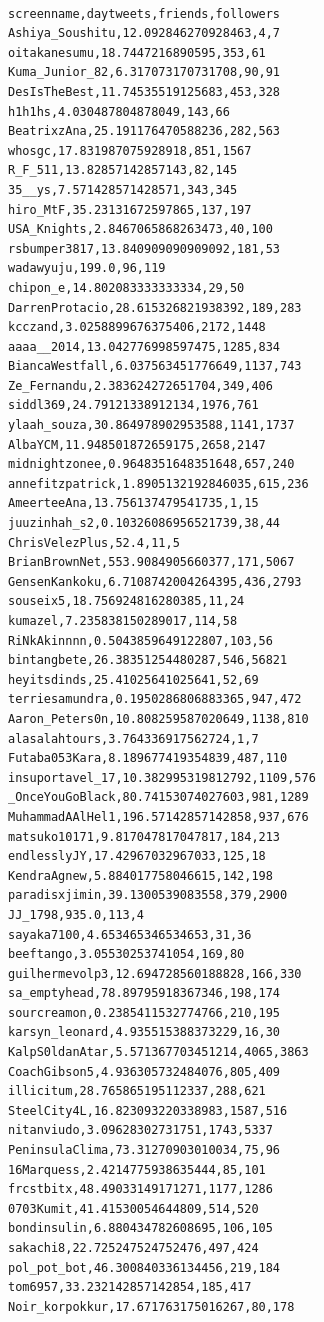 \begin{verbatim}

screenname,daytweets,friends,followers
Ashiya_Soushitu,12.092846270928463,4,7
oitakanesumu,18.7447216890595,353,61
Kuma_Junior_82,6.317073170731708,90,91
DesIsTheBest,11.74535519125683,453,328
h1h1hs,4.030487804878049,143,66
BeatrixzAna,25.191176470588236,282,563
whosgc,17.831987075928918,851,1567
R_F_511,13.82857142857143,82,145
35__ys,7.571428571428571,343,345
hiro_MtF,35.23131672597865,137,197
USA_Knights,2.8467065868263473,40,100
rsbumper3817,13.840909090909092,181,53
wadawyuju,199.0,96,119
chipon_e,14.802083333333334,29,50
DarrenProtacio,28.615326821938392,189,283
kcczand,3.0258899676375406,2172,1448
aaaa__2014,13.042776998597475,1285,834
BiancaWestfall,6.037563451776649,1137,743
Ze_Fernandu,2.383624272651704,349,406
siddl369,24.79121338912134,1976,761
ylaah_souza,30.864978902953588,1141,1737
AlbaYCM,11.948501872659175,2658,2147
midnightzonee,0.9648351648351648,657,240
annefitzpatrick,1.8905132192846035,615,236
AmeerteeAna,13.756137479541735,1,15
juuzinhah_s2,0.10326086956521739,38,44
ChrisVelezPlus,52.4,11,5
BrianBrownNet,553.9084905660377,171,5067
GensenKankoku,6.7108742004264395,436,2793
souseix5,18.756924816280385,11,24
kumazel,7.235838150289017,114,58
RiNkAkinnnn,0.5043859649122807,103,56
bintangbete,26.38351254480287,546,56821
heyitsdinds,25.41025641025641,52,69
terriesamundra,0.1950286806883365,947,472
Aaron_Peters0n,10.808259587020649,1138,810
alasalahtours,3.764336917562724,1,7
Futaba053Kara,8.189677419354839,487,110
insuportavel_17,10.382995319812792,1109,576
_OnceYouGoBlack,80.74153074027603,981,1289
MuhammadAAlHel1,196.57142857142858,937,676
matsuko10171,9.817047817047817,184,213
endlesslyJY,17.42967032967033,125,18
KendraAgnew,5.884017758046615,142,198
paradisxjimin,39.1300539083558,379,2900
JJ_1798,935.0,113,4
sayaka7100,4.653465346534653,31,36
beeftango,3.05530253741054,169,80
guilhermevolp3,12.694728560188828,166,330
sa_emptyhead,78.89795918367346,198,174
sourcreamon,0.2385411532774766,210,195
karsyn_leonard,4.935515388373229,16,30
KalpS0ldanAtar,5.571367703451214,4065,3863
CoachGibson5,4.936305732484076,805,409
illicitum,28.765865195112337,288,621
SteelCity4L,16.823093220338983,1587,516
nitanviudo,3.09628302731751,1743,5337
PeninsulaClima,73.31270903010034,75,96
16Marquess,2.4214775938635444,85,101
frcstbitx,48.49033149171271,1177,1286
0703Kumit,41.41530054644809,514,520
bondinsulin,6.880434782608695,106,105
sakachi8,22.725247524752476,497,424
pol_pot_bot,46.300840336134456,219,184
tom6957,33.232142857142854,185,417
Noir_korpokkur,17.671763175016267,80,178

\end{verbatim}
